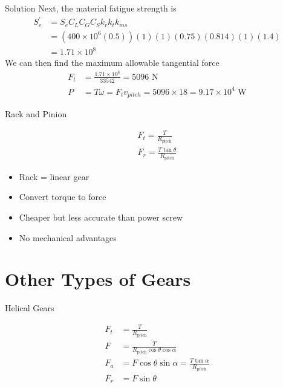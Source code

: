 \documentclass[
10pt,
a4paper,
openany,
svgnames,
]{book}
\begin{document}
\begin{frame}{Solution}
  Next, the material fatigue strength is
  \begin{align*}
    S_{e}^{\prime} &= S_{e}C_{L}C_{G}C_{S}k_{r}k_{t}k_{ms} \\
                   &= (400 \times 10^{6}(0.5))(1)(1)(0.75)(0.814)(1)(1.4) \\
                   &= 1.71 \times 10^{8}
  \end{align*}
  We can then find the maximum allowable tangential force
  \begin{align*}
    F_{t} &= \frac{1.71 \times 10^{8}}{33542} = 5096 \text{ N} \\
    P &= T \omega = F_{t} v_{pitch} = 5096 \times 18 = 9.17 \times 10^{4} \text{ W}
  \end{align*}
\end{frame}

\begin{frame}{Rack and Pinion}
  \begin{figure}[htbp]
    \centering
  \end{figure}
    \begin{align*}
      F_{t} = \frac{T}{R_{\text{pitch}}} \\
      F_{r} = \frac{T \tan \theta}{R_{\text{pitch}}}
    \end{align*}
    \begin{itemize}
      \item Rack = linear gear
      \item Convert torque to force
      \item Cheaper but less accurate than power screw
      \item No mechanical advantages
    \end{itemize}
\end{frame}

\section{Other Types of Gears}

\begin{frame}{Helical Gears}
  \begin{figure}[htbp]
    \centering
  \end{figure}
  \begin{align*}
    F_{t} &= \frac{T}{R_{\text{pitch}}} \\
    F &= \frac{T}{R_{\text{pitch}} \cos \theta \cos \alpha} \\
    F_{a} &= F \cos \theta \sin \alpha = \frac{T \tan \alpha}{R_{\text{pitch}}} \\
    F_{r} &= F \sin \theta
  \end{align*}
\end{frame}
\end{document}

